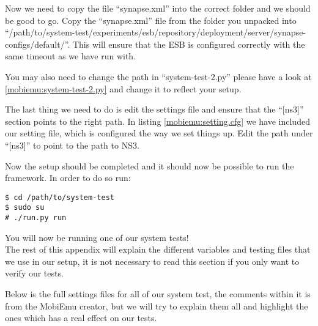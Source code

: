     Now we need to copy the file “synapse.xml” into the correct folder and we should be good to go. Copy the “synapse.xml” file from the folder you unpacked into “/path/to/system-test/experiments/esb/repository/deployment/server/synapse-configs/default/”. This will ensure that the ESB is configured correctly with the same timeout as we have run with.

    You may also need to change the path in “system-test-2.py” please have a look at \ref{mobiemu:system-test-2.py} and change it to reflect your setup.

    The last thing we need to do is edit the settings file and ensure that the “[ns3]” section points to the right path. In listing \ref{mobiemu:setting.cfg} we have included our setting file, which is configured the way we set things up. Edit the path under “[ns3]” to point to the path to NS3.

Now the setup should be completed and it should now be possible to run the framework. In order to do so run:
\lstset{language=bash, style=shell}
\begin{lstlisting}[frame=single, caption={Run MobiEmu}, label=mobiemu:run, breaklines=true]
$ cd /path/to/system-test
$ sudo su
# ./run.py run
\end{lstlisting}

    You will now be running one of our system tests!\\

    The rest of this appendix will explain the different variables and testing files that we use in our setup, it is not necessary to read this section if you only want to verify our tests.

    Below is the full settings files for all of our system test, the comments within it is from the MobiEmu creator, but we will try to explain them all and highlight the ones which has a real effect on our tests.

